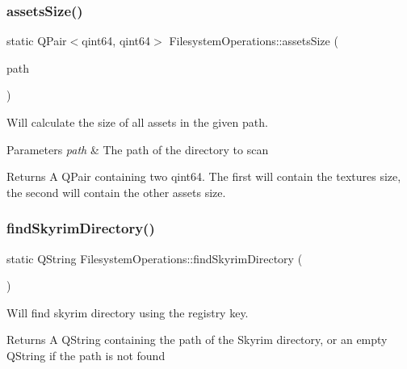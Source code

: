 \subsubsection{\texorpdfstring{assetsSize()}{assetsSize()}}
{\footnotesize\ttfamily static Q\+Pair$<$qint64, qint64$>$ Filesystem\+Operations\+::assets\+Size (\begin{DoxyParamCaption}\item[{const Q\+String \&}]{path }\end{DoxyParamCaption})\hspace{0.3cm}{\ttfamily [static]}}



Will calculate the size of all assets in the given path. 


\begin{DoxyParams}{Parameters}
{\em path} & The path of the directory to scan \\
\hline
\end{DoxyParams}
\begin{DoxyReturn}{Returns}
A Q\+Pair containing two qint64. The first will contain the textures size, the second will contain the other assets size. 
\end{DoxyReturn}
\mbox{\label{class_filesystem_operations_a8752f3f1a2021546b8b46929316ebe0f}} 
\subsubsection{\texorpdfstring{findSkyrimDirectory()}{findSkyrimDirectory()}}
{\footnotesize\ttfamily static Q\+String Filesystem\+Operations\+::find\+Skyrim\+Directory (\begin{DoxyParamCaption}{ }\end{DoxyParamCaption})\hspace{0.3cm}{\ttfamily [static]}}



Will find skyrim directory using the registry key. 

\begin{DoxyReturn}{Returns}
A Q\+String containing the path of the Skyrim directory, or an empty Q\+String if the path is not found 
\end{DoxyReturn}
\mbox{\label{class_filesystem_operations_a25865348225a485bdcce684801118533}} 

